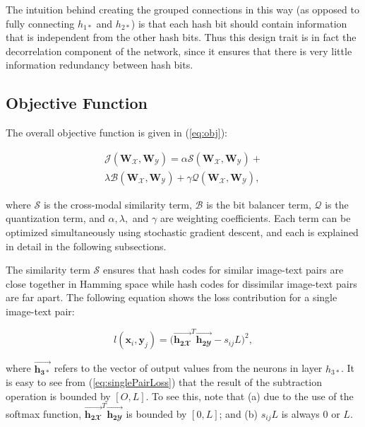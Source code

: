 \documentclass[letterpaper]{article}
\newcommand{\WX}{\mathbf{W}_\mathcal{X}}
\newcommand{\WY}{\mathbf{W}_\mathcal{Y}}
\newcommand{\htwoxv}{\vec{\mathbf{h_{2\mathbfcal{X}}}}}
\newcommand{\htwoyv}{\vec{\mathbf{h_{2\mathbfcal{Y}}}}}
\newcommand{\xii}{\mathbf{x}_i}
\newcommand{\yj}{\mathbf{y}_j}
\begin{document}
The intuition behind creating the grouped connections in this way (as opposed to fully connecting $ h_{1*} $ and $ h_{2*} $) is that each hash bit should contain information that is independent from the other hash bits. Thus this design trait is in fact the decorrelation component of the network, since it ensures that there is very little information redundancy between hash bits.

\subsection{Objective Function}

The overall objective function is given in (\ref{eq:obj}):

\begin{equation}
\label{eq:obj}
\begin{gathered}
\mathcal{J}(\WX, \WY) = \alpha\mathcal{S}(\WX, \WY) + \\
\lambda\mathcal{B}(\WX, \WY) + 
\gamma\mathcal{Q}(\WX, \WY),
\end{gathered}
\end{equation}

\noindent where $ \mathcal{S} $ is the cross-modal similarity term, $ \mathcal{B} $ is the bit balancer term, $ \mathcal{Q} $ is the quantization term, and $ \alpha, \lambda, $ and $ \gamma $ are weighting coefficients. Each term can be optimized simultaneously using stochastic gradient descent, and each is explained in detail in the following subsections.

The similarity term $ \mathcal{S} $ ensures that hash codes for similar image-text pairs are close together in Hamming space while hash codes for dissimilar image-text pairs are far apart. The following equation shows the loss contribution for a single image-text pair:

\begin{equation}
\label{eq:singlePairLoss}
l(\xii,\yj) = \big( \htwoxv^T \htwoyv - s_{ij}L \big)^2,
\end{equation}

\noindent where $ \vec{\mathbf{h_{3*}}} $ refers to the vector of output values from the neurons in layer $ h_{3*} $. It is easy to see from (\ref{eq:singlePairLoss}) that the result of the subtraction operation is bounded by $ [O, L] $. To see this, note that (a) due to the use of the softmax function, $ \htwoxv^T \htwoyv $ is bounded by $ [\text{0}, L] $; and (b) $ s_{ij}L $ is always 0 or $ L $.
\end{document}
